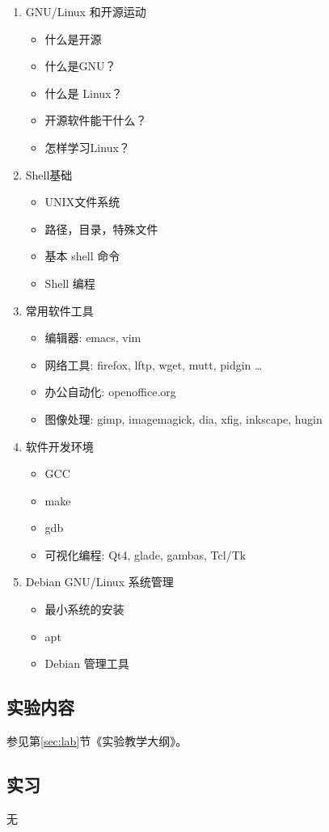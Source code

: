\documentclass{wx672article}
\begin{document}
\begin{enumerate}
\item GNU/Linux 和开源运动
\begin{itemize}
\item 什么是开源
\item 什么是GNU？
\item 什么是 Linux？
\item 开源软件能干什么？
\item 怎样学习Linux？
\end{itemize}
\item Shell基础
\begin{itemize}
\item UNIX文件系统
\item 路径，目录，特殊文件
\item 基本 shell 命令
\item Shell 编程
\end{itemize}
\item 常用软件工具
\begin{itemize}
\item 编辑器: emacs, vim
\item 网络工具: firefox, lftp, wget, mutt, pidgin \ldots{}
\item 办公自动化: openoffice.org
\item 图像处理: gimp, imagemagick, dia, xfig, inkscape, hugin
\end{itemize}
\item 软件开发环境
\begin{itemize}
\item GCC
\item make
\item gdb
\item 可视化编程: Qt4, glade, gambas, Tcl/Tk
\end{itemize}
\item Debian GNU/Linux 系统管理
\begin{itemize}
\item 最小系统的安装
\item apt
\item Debian 管理工具
\end{itemize}
\end{enumerate}
\subsection{实验内容}

参见第\ref{sec:lab}节《实验教学大纲》。

\subsection{实习}
无
\end{document}
